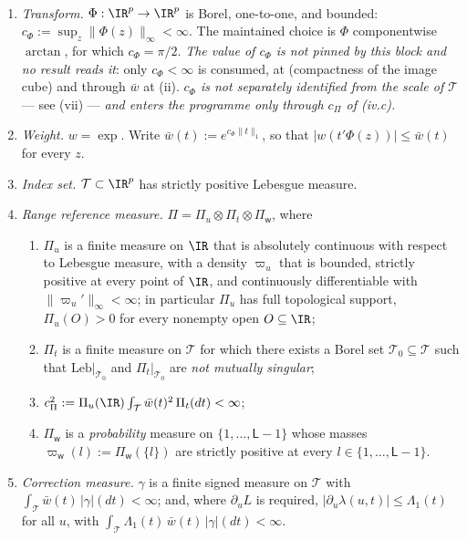 \begin{assumption}\label{ass:bierens}~
\begin{enumerate}
\item[(i)] \emph{Transform.} $\Phi:\IR^{p}\to\IR^{p}$ is Borel, one-to-one, and bounded:
$c_\Phi:=\sup_{z}\|\Phi(z)\|_\infty<\infty$. The maintained choice is $\Phi$ componentwise $\arctan$,
for which $c_\Phi=\pi/2$. \emph{The value of $c_\Phi$ is not pinned by this block and no result reads
it}: only $c_\Phi<\infty$ is consumed, at  \textup{(compactness of the
image cube)} and through $\bar w$ at \textup{(ii)}. \emph{$c_\Phi$ is not separately identified from
the scale of $\mathcal T$} --- see \textup{(vii)} --- \emph{and enters the
programme only through $c_\Pi$ of \textup{(iv.c)}.}
\item[(ii)] \emph{Weight.} $w=\exp$. Write $\bar w(t):=e^{c_\Phi\|t\|_1}$, so that
$|w(t'\Phi(z))|\le\bar w(t)$ for every $z$.
\item[(iii)] \emph{Index set.} $\mathcal T\subset\IR^{p}$ has strictly positive Lebesgue measure.
\item[(iv)] \emph{Range reference measure.} $\Pi=\Pi_u\otimes\Pi_t\otimes\Pi_{\mathsf w}$, where
\begin{enumerate}
\item[(iv.a)] $\Pi_u$ is a finite measure on $\IR$ that is absolutely continuous with respect to
Lebesgue measure, with a density $\varpi_u$ that is bounded, strictly positive at every point of $\IR$,
and continuously differentiable with $\|\varpi_u'\|_\infty<\infty$; in particular $\Pi_u$ has full
topological support, $\Pi_u(O)>0$ for every nonempty open $O\subseteq\IR$;
\item[(iv.b)] $\Pi_t$ is a finite measure on $\mathcal T$ for which there exists a Borel set
$\mathcal T_0\subseteq\mathcal T$ such that $\mathrm{Leb}|_{\mathcal T_0}$ and $\Pi_t|_{\mathcal T_0}$
are \emph{not mutually singular};
\item[(iv.c)] $c_\Pi^{2}:=\Pi_u(\IR)\int_{\mathcal T}\bar w(t)^{2}\,\Pi_t(dt)<\infty$;
\item[(iv.d)] $\Pi_{\mathsf w}$ is a \emph{probability} measure on $\{1,\dots,\mathsf L-1\}$ whose masses
$\varpi_{\mathsf w}(l):=\Pi_{\mathsf w}(\{l\})$ are strictly positive at every
$l\in\{1,\dots,\mathsf L-1\}$.
\end{enumerate}
\item[(v)] \emph{Correction measure.} $\gamma$ is a finite signed measure on $\mathcal T$ with
$\int_{\mathcal T}\bar w(t)\,|\gamma|(dt)<\infty$; and, where $\partial_u L$ is required,
$|\partial_u\lambda(u,t)|\le\Lambda_1(t)$ for all $u$, with
$\int_{\mathcal T}\Lambda_1(t)\,\bar w(t)\,|\gamma|(dt)<\infty$.
\end{enumerate}
\end{assumption}

